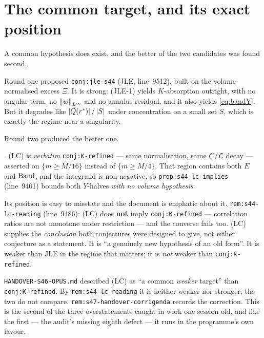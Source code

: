 \section{The common target, and its exact position}
\label{sec:lc}

A common hypothesis does exist, and the better of the two candidates was found
second.

Round one proposed \texttt{conj:jle-s44} (JLE, line~9512), built on the
volume-normalised excess \(\Xi\). It is strong: (JLE-1) yields \(K\)-absorption
outright, with no angular term, no \(\left\|w\right\|_{L^\infty}\) and no annulus
residual, and it also yields \eqref{eq:bandY}. But it degrades like
\(\left|Q(r^{*})\right|/\left|S\right|\) under concentration on a small set \(S\), which is
exactly the regime near a singularity.

Round two produced the better one.

\begin{statement}
\label{st:lc}
\OPEN{}. (LC) is \emph{verbatim} \texttt{conj:K-refined} --- same
normalisation, same \(C/\mathcal{L}\) decay --- asserted on \(\{m\ge M/16\}\) instead
of \(\{m\ge M/4\}\). That region contains both \(E\) and \(\mathrm{Band}\), and the
integrand is non-negative, so \texttt{prop:s44-lc-implies} (line~9461) bounds
both \(Y\)-halves \emph{with no volume hypothesis}.
\end{statement}

Its position is easy to misstate and the document is emphatic about it.
\texttt{rem:s44-lc-reading} (line~9486): (LC) does \textbf{not} imply
\texttt{conj:K-refined} --- correlation ratios are not monotone under
restriction --- and the converse fails too. (LC) supplies the
\emph{conclusion} both conjectures were designed to give, not either
conjecture as a statement. It is ``a genuinely new hypothesis of an old
form''. It is weaker than JLE in the regime that matters; it is \emph{not}
weaker than \texttt{conj:K-refined}.

\begin{obsv}
\label{obs:lc-not-weaker}
\texttt{HANDOVER-S46-OPUS.md} described (LC) as ``a common \emph{weaker}
target'' than \texttt{conj:K-refined}. By \texttt{rem:s44-lc-reading} it is
neither weaker nor stronger; the two do not compare.
\texttt{rem:s47-handover-corrigenda} records the correction. This is the
second of the three overstatements  caught in work one session old, and
like the first --- the audit's missing eighth defect --- it runs in the
programme's own favour.
\end{obsv}

